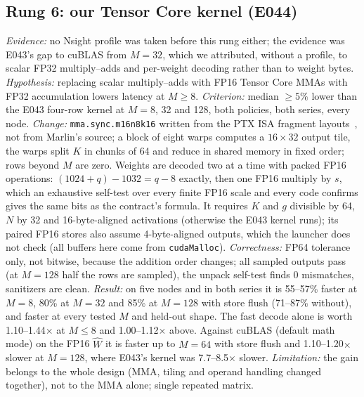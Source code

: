 \documentclass[sigconf,nonacm]{acmart}
\begin{document}
\subsection{Rung 6: our Tensor Core kernel (E044)}
\emph{Evidence:} no Nsight profile was taken before this rung either; the evidence was E043's gap to cuBLAS from $M=32$, which we attributed, without a profile, to scalar FP32 multiply--adds and per-weight decoding rather than to weight bytes. \emph{Hypothesis:} replacing scalar multiply--adds with FP16 Tensor Core MMAs with FP32 accumulation lowers latency at $M \ge 8$. \emph{Criterion:} median $\ge 5\%$ lower than the E043 four-row kernel at $M=8$, 32 and 128, both policies, both series, every node. \emph{Change:} \texttt{mma.sync.m16n8k16} written from the PTX ISA fragment layouts~\cite{ptx}, not from Marlin's source; a block of eight warps computes a $16\times 32$ output tile, the warps split $K$ in chunks of 64 and reduce in shared memory in fixed order; rows beyond $M$ are zero. Weights are decoded two at a time with packed FP16 operations: $(1024+q) - 1032 = q-8$ exactly, then one FP16 multiply by $s$, which an exhaustive self-test over every finite FP16 scale and every code confirms gives the same bits as the contract's formula. It requires $K$ and $g$ divisible by 64, $N$ by 32 and 16-byte-aligned activations (otherwise the E043 kernel runs); its paired FP16 stores also assume 4-byte-aligned outputs, which the launcher does not check (all buffers here come from \texttt{cudaMalloc}). \emph{Correctness:} FP64 tolerance only, not bitwise, because the addition order changes; all sampled outputs pass (at $M=128$ half the rows are sampled), the unpack self-test finds 0 mismatches, sanitizers are clean. \emph{Result:} on five nodes and in both series it is 55--57\% faster at $M=8$, 80\% at $M=32$ and 85\% at $M=128$ with store flush (71--87\% without), and faster at every tested $M$ and held-out shape. The fast decode alone is worth 1.10--1.44$\times$ at $M \le 8$ and 1.00--1.12$\times$ above. Against cuBLAS (default math mode) on the FP16 $\hat W$ it is faster up to $M=64$ with store flush and 1.10--1.20$\times$ slower at $M=128$, where E043's kernel was 7.7--8.5$\times$ slower. \emph{Limitation:} the gain belongs to the whole design (MMA, tiling and operand handling changed together), not to the MMA alone; single repeated matrix.
\end{document}
